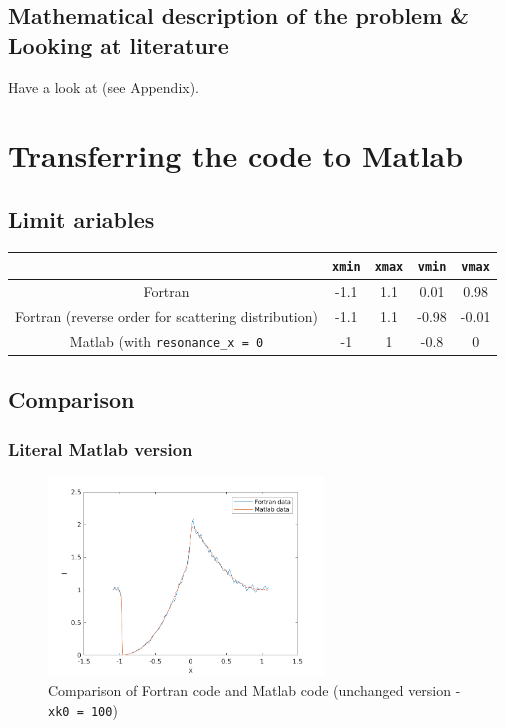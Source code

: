 \documentclass[../main/main.tex]{subfiles}
\begin{document}
\subsection{Mathematical description of the problem \&
Looking at literature}
Have a look at \cite{NoebauerUlrichM_2019MCRT} (see Appendix).

\newpage
\section{Transferring the code to Matlab}

\subsection{Limit ariables}
\begin{center}
\centering
{\tabulinesep=1.5mm
\begin{tabu}{|c|c|c|c|c|}
\hline 
& \texttt{xmin} & \texttt{xmax} & \texttt{vmin} & \texttt{vmax} \\ \hline
Fortran & -1.1 &  1.1 & 0.01 & 0.98   \\ 
Fortran (reverse order for scattering distribution) & -1.1 &  1.1 & -0.98 & -0.01 \\ \hline
Matlab (with \texttt{resonance\_x = 0} & -1 & 1 & -0.8 & 0 \\ \hline
\end{tabu}}
\end{center}

\subsection{Comparison}

\subsubsection{Literal Matlab version}
\begin{figure}[!htp]
\centering
\includegraphics[width=0.65\textwidth]{../../two_resonance_lines/figures/compare_Matlab_Fortran_literally_100.png}
\caption{Comparison of Fortran code and Matlab code (unchanged version - \texttt{xk0 = 100})}
\label{variance_reduction_test}
\end{figure}
\end{document}
